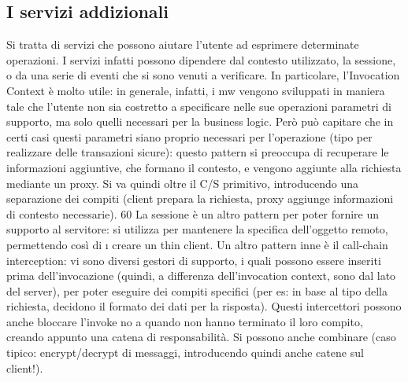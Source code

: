 \subsection{I servizi addizionali}
Si tratta di servizi che possono aiutare l'utente ad esprimere determinate operazioni. I servizi infatti possono
dipendere dal contesto utilizzato, la sessione, o
da una serie di eventi che si sono venuti a verificare.
In particolare, l'Invocation Context è molto utile: in generale, infatti, i mw
vengono sviluppati in maniera tale che l'utente non sia costretto a specificare
nelle sue operazioni parametri di supporto, ma solo quelli necessari per la business logic. Però può capitare che in
certi casi questi parametri siano proprio
necessari per l'operazione (tipo per realizzare delle transazioni sicure): questo
pattern si preoccupa di recuperare le informazioni aggiuntive, che formano il
contesto, e vengono aggiunte alla richiesta mediante un proxy. Si va quindi
oltre il C/S primitivo, introducendo una separazione dei compiti (client prepara
la richiesta, proxy aggiunge informazioni di contesto necessarie).
60
La sessione è un altro pattern per poter fornire un supporto al servitore:
si utilizza per mantenere la specifica dell'oggetto remoto, permettendo così di
\i{}
creare un thin client.
Un altro pattern inne è il call-chain interception: vi sono diversi gestori
di supporto, i quali possono essere inseriti prima dell'invocazione (quindi, a
differenza dell'invocation context, sono dal lato del server), per poter eseguire
dei compiti specifici (per es: in base al tipo della richiesta, decidono il formato
dei dati per la risposta). Questi intercettori possono anche bloccare l'invoke no
a quando non hanno terminato il loro compito, creando appunto una catena di
responsabilità. Si possono anche combinare (caso tipico: encrypt/decrypt di
messaggi, introducendo quindi anche catene sul client!).
